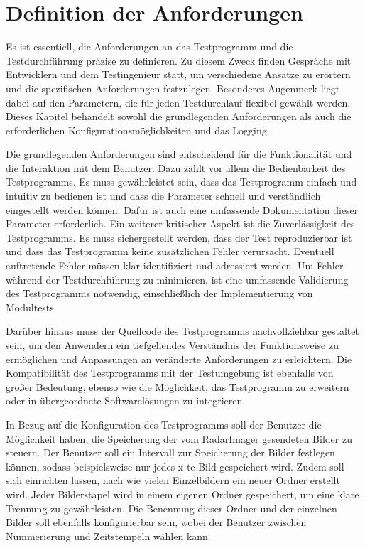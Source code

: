 \section{Definition der Anforderungen}

Es ist essentiell, die Anforderungen an das Testprogramm und die Testdurchführung präzise zu definieren. Zu diesem Zweck finden Gespräche mit Entwicklern und dem Testingenieur
statt, um verschiedene Ansätze zu erörtern und die spezifischen Anforderungen festzulegen. Besonderes Augenmerk liegt dabei auf den Parametern, die für jeden Testdurchlauf flexibel 
gewählt werden. Dieses Kapitel behandelt sowohl die grundlegenden Anforderungen als auch die erforderlichen Konfigurationsmöglichkeiten und das Logging.

Die grundlegenden Anforderungen sind entscheidend für die Funktionalität und die Interaktion mit dem Benutzer. Dazu zählt vor allem die Bedienbarkeit des Testprogramms. 
Es muss gewährleistet sein, dass das Testprogramm einfach und intuitiv zu bedienen ist und dass die Parameter schnell und verständlich eingestellt werden können. Dafür ist auch eine umfassende 
Dokumentation dieser Parameter erforderlich. Ein weiterer kritischer Aspekt ist die Zuverlässigkeit des Testprogramms. Es muss sichergestellt werden, dass der Test 
reproduzierbar ist und dass das Testprogramm keine zusätzlichen Fehler verursacht. Eventuell auftretende Fehler müssen klar identifiziert und adressiert werden. Um 
Fehler während der Testdurchführung zu minimieren, ist eine umfassende Validierung des Testprogramms notwendig, einschließlich der Implementierung von Modultests.

Darüber hinaus muss der Quellcode des Testprogramms nachvollziehbar gestaltet sein, um den Anwendern ein tiefgehendes Verständnis der Funktionsweise zu ermöglichen und Anpassungen 
an veränderte Anforderungen zu erleichtern. Die Kompatibilität des Testprogramms mit der Testumgebung ist ebenfalls von großer Bedeutung, ebenso wie die Möglichkeit, das Testprogramm 
zu erweitern oder in übergeordnete Softwarelösungen zu integrieren.

In Bezug auf die Konfiguration des Testprogramms soll der Benutzer die Möglichkeit haben, die Speicherung der vom RadarImager gesendeten Bilder zu steuern. 
Der Benutzer soll ein Intervall zur Speicherung der Bilder festlegen können, sodass beispielsweise nur jedes x-te Bild gespeichert wird. Zudem soll sich einrichten lassen,
nach wie vielen Einzelbildern ein neuer Ordner erstellt wird. Jeder Bilderstapel wird in einem eigenen Ordner gespeichert, um eine klare Trennung zu gewährleisten. 
Die Benennung dieser Ordner und der einzelnen Bilder soll ebenfalls konfigurierbar sein, wobei der Benutzer zwischen Nummerierung und Zeitstempeln wählen kann.

